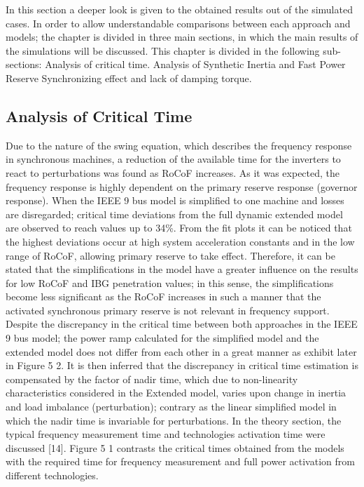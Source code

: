 
In this section a deeper look is given to the obtained results out of the simulated cases. In order to allow understandable comparisons between each approach and models; the chapter is divided in three main sections, in which the main results of the simulations will be discussed. This chapter is divided in the following sub-sections:
	Analysis of critical time.
	Analysis of Synthetic Inertia and Fast Power Reserve
	Synchronizing effect and lack of damping torque.

\subsection{Analysis of Critical Time} 

Due to the nature of the swing equation, which describes the frequency response in synchronous machines, a reduction of the available time for the inverters to react to perturbations was found as RoCoF increases.
As it was expected, the frequency response is highly dependent on the primary reserve response (governor response). When the IEEE 9 bus model is simplified to one machine and losses are disregarded; critical time deviations from the full dynamic extended model are observed to reach values up to 34\%. From the fit plots it can be noticed that the highest deviations occur at high system acceleration constants and in the low range of RoCoF, allowing primary reserve to take effect. Therefore, it can be stated that the simplifications in the model have a greater influence on the results for low RoCoF and IBG penetration values; in this sense, the simplifications become less significant as the RoCoF increases in such a manner that the activated synchronous primary reserve is not relevant in frequency support.
Despite the discrepancy in the critical time between both approaches in the IEEE 9 bus model; the power ramp calculated for the simplified model and the extended model does not differ from each other in a great manner as exhibit later in Figure 5 2. It is then inferred that the discrepancy in critical time estimation is compensated by the factor of nadir time, which due to non-linearity characteristics considered in the Extended model, varies upon change in inertia and load imbalance (perturbation); contrary as the linear simplified model in which the nadir time is invariable for perturbations.
In the theory section, the typical frequency measurement time and technologies activation time were discussed [14]. Figure 5 1 contrasts the critical times obtained from the models with the required time for frequency measurement and full power activation from different technologies.


